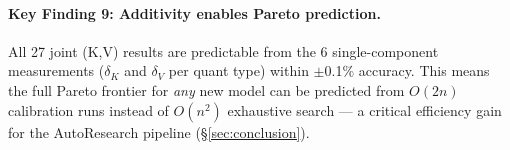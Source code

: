 \paragraph{Key Finding 9: Additivity enables Pareto prediction.}
All 27 joint (K,V) results are predictable from the 6 single-component measurements ($\delta_K$ and $\delta_V$ per quant type) within $\pm$0.1\% accuracy. This means the full Pareto frontier for \emph{any} new model can be predicted from $O(2n)$ calibration runs instead of $O(n^2)$ exhaustive search --- a critical efficiency gain for the AutoResearch pipeline (\S\ref{sec:conclusion}).
